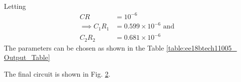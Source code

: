 \begin{enumerate}[label=\arabic*.,ref=\theenumi]
\begin{align}
\end{align}
Letting 
\begin{align}
CR&= 10^{-6}\\
  \implies C_1R_1 &= 0.599\times 10^{-6} \text{ and }\\
  C_2R_2 &= 0.681\times10^{-6}
\end{align}
The parameters can be chosen as shown in the Table \ref{table:ee18btech11005_ Output_Table}
\renewcommand{\thefigure}{\theenumi.\arabic{figure}}
\begin{figure}[!hbt]
	\begin{center}
			\resizebox{\columnwidth}{!}{}
	\end{center}
\caption{}
\label{fig:circuit_design}
\end{figure}
%
The final circuit is shown in Fig. \ref{fig:final_design}.
\begin{figure}[!hbt]
	\begin{center}
			\resizebox{\columnwidth}{!}{}
	\end{center}
\caption{}
\label{fig:final_design}
\end{figure}
\renewcommand{\thefigure}{\theenumi}
\begin{table}[!ht]
\centering

\caption{}
\label{table:ee18btech11005_ Output_Table}
\end{table}


\end{enumerate}
